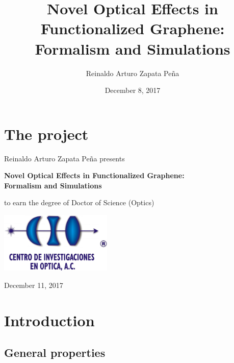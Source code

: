 \documentclass{beamer}
\title[Novel Optical Effects in Functionalized Graphene: 
Formalism and Simulations]
{Novel Optical Effects in Functionalized Graphene: 
Formalism and Simulations}
\author{Reinaldo Arturo Zapata Pe\~na}
\institute{Centro de Investigaciones en \'Optica, A.C.}
\date{December 8, 2017}
\begin{document}
\section*{The project}


\begin{frame}

{\large \rmfamily Reinaldo Arturo Zapata Pe\~na presents}

\begin{center}

{\large \rmfamily \textbf{Novel Optical Effects in Functionalized Graphene: \\ 
Formalism and Simulations}}

\end{center}

{\rmfamily to earn the degree of Doctor of Science (Optics)}


\begin{center}
\includegraphics[width=0.4\textwidth]{figs/logoCIO.jpeg}

\vspace{2mm}
{\rmfamily \small December 11, 2017}
\end{center}

\end{frame}




\section{Introduction}





\subsection{General properties}
\end{document}

